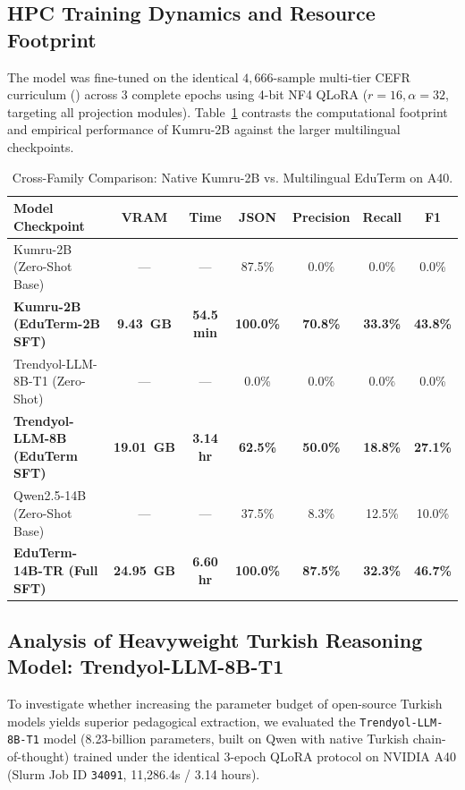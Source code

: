\documentclass[a4paper,12pt]{report}
\begin{document}
\subsection{HPC Training Dynamics and Resource Footprint}
The model was fine-tuned on the identical $4,666$-sample multi-tier CEFR curriculum () across $3$ complete epochs using 4-bit NF4 QLoRA ($r=16, \alpha=32$, targeting all projection modules). Table~\ref{tab:kumru_vs_qwen_comparison} contrasts the computational footprint and empirical performance of Kumru-2B against the larger multilingual checkpoints.

\begin{table}[htbp]
\centering
\small
\caption{Cross-Family Comparison: Native Kumru-2B vs. Multilingual EduTerm on A40.}
\label{tab:kumru_vs_qwen_comparison}
\scriptsize\setlength{\tabcolsep}{2pt}
\begin{tabularx}{\textwidth}{>{\RaggedRight\arraybackslash}Xcccccc}
\toprule
\textbf{Model Checkpoint} & \textbf{VRAM} & \textbf{Time} & \textbf{JSON} & \textbf{Precision} & \textbf{Recall} & \textbf{F1} \\
\midrule
Kumru-2B (Zero-Shot Base) & --- & --- & 87.5\% & 0.0\% & 0.0\% & 0.0\% \\
\textbf{Kumru-2B (EduTerm-2B SFT)} & \textbf{9.43~GB} & \textbf{54.5 min} & \textbf{100.0\%} & \textbf{70.8\%} & \textbf{33.3\%} & \textbf{43.8\%} \\
Trendyol-LLM-8B-T1 (Zero-Shot) & --- & --- & 0.0\% & 0.0\% & 0.0\% & 0.0\% \\
\textbf{Trendyol-LLM-8B (EduTerm SFT)} & \textbf{19.01~GB} & \textbf{3.14 hr} & \textbf{62.5\%} & \textbf{50.0\%} & \textbf{18.8\%} & \textbf{27.1\%} \\
Qwen2.5-14B (Zero-Shot Base) & --- & --- & 37.5\% & 8.3\% & 12.5\% & 10.0\% \\
\textbf{EduTerm-14B-TR (Full SFT)} & \textbf{24.95~GB} & \textbf{6.60 hr} & \textbf{100.0\%} & \textbf{87.5\%} & \textbf{32.3\%} & \textbf{46.7\%} \\
\bottomrule
\end{tabularx}
\end{table}

\subsection{Analysis of Heavyweight Turkish Reasoning Model: Trendyol-LLM-8B-T1}
To investigate whether increasing the parameter budget of open-source Turkish models yields superior pedagogical extraction, we evaluated the \texttt{Trendyol-LLM-8B-T1} model (8.23-billion parameters, built on Qwen with native Turkish chain-of-thought) trained under the identical 3-epoch QLoRA protocol on NVIDIA A40 (Slurm Job ID \texttt{34091}, 11,286.4s / 3.14 hours).
\end{document}
